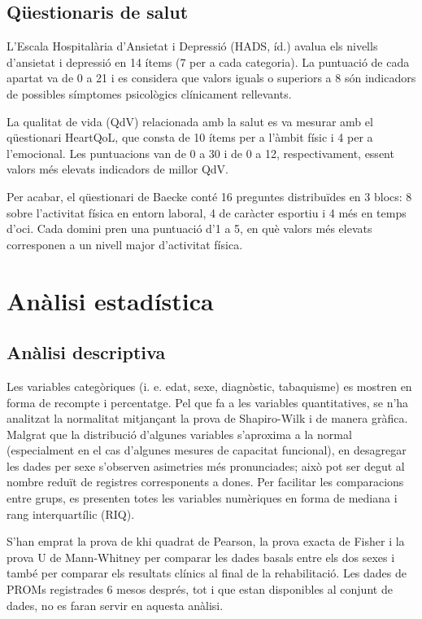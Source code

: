 \documentclass[CAT]{TFUOC}%
\begin{document}
\subsection{Qüestionaris de salut}\label{quxfcestionaris-de-salut}

L'Escala Hospitalària d'Ansietat i Depressió (HADS, íd.) avalua els nivells d'ansietat i depressió en 14 ítems (7 per a cada categoria). La puntuació de cada apartat va de 0 a 21 i es considera que valors iguals o superiors a 8 són indicadors de possibles símptomes psicològics clínicament rellevants.

La qualitat de vida (QdV) relacionada amb la salut es va mesurar amb el qüestionari HeartQoL, que consta de 10 ítems per a l'àmbit físic i 4 per a l'emocional. Les puntuacions van de 0 a 30 i de 0 a 12, respectivament, essent valors més elevats indicadors de millor QdV.

Per acabar, el qüestionari de Baecke conté 16 preguntes distribuïdes en 3 blocs: 8 sobre l'activitat física en entorn laboral, 4 de caràcter esportiu i 4 més en temps d'oci. Cada domini pren una puntuació d'1 a 5, en què valors més elevats corresponen a un nivell major d'activitat física.

\section{Anàlisi estadística}\label{anuxe0lisi-estaduxedstica}

\subsection{Anàlisi descriptiva}\label{anuxe0lisi-descriptiva}

Les variables categòriques (i. e. edat, sexe, diagnòstic, tabaquisme) es mostren en forma de recompte i percentatge. Pel que fa a les variables quantitatives, se n'ha analitzat la normalitat mitjançant la prova de Shapiro-Wilk i de manera gràfica. Malgrat que la distribució d'algunes variables s'aproxima a la normal (especialment en el cas d'algunes mesures de capacitat funcional), en desagregar les dades per sexe s'observen asimetries més pronunciades; això pot ser degut al nombre reduït de registres corresponents a dones. Per facilitar les comparacions entre grups, es presenten totes les variables numèriques en forma de mediana i rang interquartílic (RIQ).

S'han emprat la prova de khi quadrat de Pearson, la prova exacta de Fisher i la prova U de Mann-Whitney per comparar les dades basals entre els dos sexes i també per comparar els resultats clínics al final de la rehabilitació. Les dades de PROMs registrades 6 mesos després, tot i que estan disponibles al conjunt de dades, no es faran servir en aquesta anàlisi.
\end{document}
